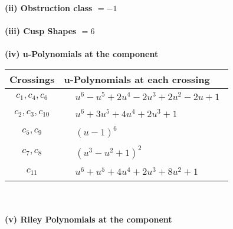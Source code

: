 \documentclass[1p]{elsarticle_modified}
\theoremstyle{definition}
\begin{document}
\flushleft \textbf{(ii) Obstruction class $= -1$}\\~\\
\flushleft \textbf{(iii) Cusp Shapes $= 6$}\\~\\
\newpage\renewcommand{\arraystretch}{1}
\flushleft \textbf{(iv) u-Polynomials at the component}\newline \\
\begin{tabular}{m{50pt}|m{274pt}}
Crossings & \hspace{64pt}u-Polynomials at each crossing \\
\hline $$\begin{aligned}c_{1},c_{4},c_{6}\end{aligned}$$&$\begin{aligned}
&u^6- u^5+2 u^4-2 u^3+2 u^2-2 u+1
\end{aligned}$\\
\hline $$\begin{aligned}c_{2},c_{3},c_{10}\end{aligned}$$&$\begin{aligned}
&u^6+3 u^5+4 u^4+2 u^3+1
\end{aligned}$\\
\hline $$\begin{aligned}c_{5},c_{9}\end{aligned}$$&$\begin{aligned}
&(u-1)^6
\end{aligned}$\\
\hline $$\begin{aligned}c_{7},c_{8}\end{aligned}$$&$\begin{aligned}
&(u^3- u^2+1)^2
\end{aligned}$\\
\hline $$\begin{aligned}c_{11}\end{aligned}$$&$\begin{aligned}
&u^6+u^5+4 u^4+2 u^3+8 u^2+1
\end{aligned}$\\
\hline
\end{tabular}\\~\\
\newpage\renewcommand{\arraystretch}{1}
\flushleft \textbf{(v) Riley Polynomials at the component}\newline \\
\end{document}
